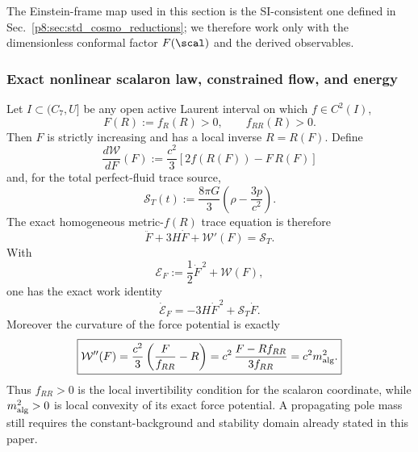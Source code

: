 \documentclass[12pt,a4paper]{article}
\begin{document}
The Einstein-frame map used in this section is the SI-consistent one defined in
Sec.~\ref{p8:sec:std_cosmo_reductions}; we therefore work only with the
dimensionless conformal factor \(F(\scal)\) and the derived observables.


\subsubsection{Exact nonlinear scalaron law, constrained flow, and energy}
\label{p8:subsec:v251-nonlinear-scalaron-law-flow}

\begin{theorem}
\label{p8:thm:v251-exact-nonlinear-scalaron-potential}
Let \(I\subset(C_7,U]\) be any open active Laurent interval on which
\(f\in C^2(I)\),
\[
 F(R):=f_R(R)>0,
 \qquad
 f_{RR}(R)>0.
\]
Then \(F\) is strictly increasing and has a local inverse \(R=R(F)\).  Define
\begin{equation}
\label{p8:eq:v251-scalaron-force-potential}
 \boxed{
 \frac{d\mathcal W}{dF}(F)
 :=\frac{c^2}{3}\left[2f(R(F))-F\,R(F)\right]}
\end{equation}
and, for the total perfect-fluid trace source,
\begin{equation}
\label{p8:eq:v251-scalaron-trace-source}
 \mathcal S_T(t)
 :=\frac{8\pi G}{3}
 \left(\rho-\frac{3p}{c^2}\right).
\end{equation}
The exact homogeneous metric-\(f(R)\) trace equation is therefore
\begin{equation}
\label{p8:eq:v251-exact-nonlinear-scalaron-equation}
 \boxed{
 \ddot F+3H\dot F+\mathcal W'(F)=\mathcal S_T.}
\end{equation}
With
\begin{equation}
\label{p8:eq:v251-scalaron-energy-functional}
 \mathcal E_F:=\frac12\dot F^{\,2}+\mathcal W(F),
\end{equation}
one has the exact work identity
\begin{equation}
\label{p8:eq:v251-scalaron-energy-work}
 \boxed{
 \dot{\mathcal E}_F
 =-3H\dot F^{\,2}+\mathcal S_T\dot F.}
\end{equation}
Moreover the curvature of the force potential is exactly
\begin{equation}
\label{p8:eq:v251-potential-curvature-mass}
 \boxed{
 \mathcal W''(F)
 =\frac{c^2}{3}\left(\frac{F}{f_{RR}}-R\right)
 =c^2\,\frac{F-Rf_{RR}}{3f_{RR}}
 =c^2m_{\rm alg}^{2}.}
\end{equation}
Thus \(f_{RR}>0\) is the local invertibility condition for the scalaron
coordinate, while \(m_{\rm alg}^2>0\) is local convexity of its exact force
potential.  A propagating pole mass still requires the constant-background
and stability domain already stated in this paper.
\end{theorem}
\end{document}
